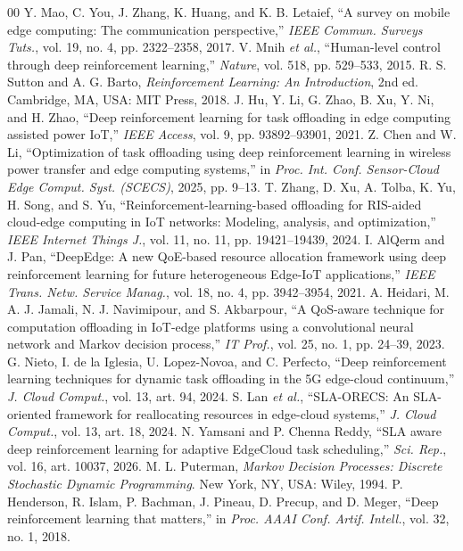 \documentclass[journal]{IEEEtran}
\begin{document}
\begin{thebibliography}{00}
 Y. Mao, C. You, J. Zhang, K. Huang, and K. B. Letaief, ``A survey on mobile edge computing: The communication perspective,'' \emph{IEEE Commun. Surveys Tuts.}, vol. 19, no. 4, pp. 2322--2358, 2017.
 V. Mnih \emph{et al.}, ``Human-level control through deep reinforcement learning,'' \emph{Nature}, vol. 518, pp. 529--533, 2015.
 R. S. Sutton and A. G. Barto, \emph{Reinforcement Learning: An Introduction}, 2nd ed. Cambridge, MA, USA: MIT Press, 2018.
 J. Hu, Y. Li, G. Zhao, B. Xu, Y. Ni, and H. Zhao, ``Deep reinforcement learning for task offloading in edge computing assisted power IoT,'' \emph{IEEE Access}, vol. 9, pp. 93892--93901, 2021.
 Z. Chen and W. Li, ``Optimization of task offloading using deep reinforcement learning in wireless power transfer and edge computing systems,'' in \emph{Proc. Int. Conf. Sensor-Cloud Edge Comput. Syst. (SCECS)}, 2025, pp. 9--13.
 T. Zhang, D. Xu, A. Tolba, K. Yu, H. Song, and S. Yu, ``Reinforcement-learning-based offloading for RIS-aided cloud-edge computing in IoT networks: Modeling, analysis, and optimization,'' \emph{IEEE Internet Things J.}, vol. 11, no. 11, pp. 19421--19439, 2024.
 I. AlQerm and J. Pan, ``DeepEdge: A new QoE-based resource allocation framework using deep reinforcement learning for future heterogeneous Edge-IoT applications,'' \emph{IEEE Trans. Netw. Service Manag.}, vol. 18, no. 4, pp. 3942--3954, 2021.
 A. Heidari, M. A. J. Jamali, N. J. Navimipour, and S. Akbarpour, ``A QoS-aware technique for computation offloading in IoT-edge platforms using a convolutional neural network and Markov decision process,'' \emph{IT Prof.}, vol. 25, no. 1, pp. 24--39, 2023.
 G. Nieto, I. de la Iglesia, U. Lopez-Novoa, and C. Perfecto, ``Deep reinforcement learning techniques for dynamic task offloading in the 5G edge-cloud continuum,'' \emph{J. Cloud Comput.}, vol. 13, art. 94, 2024.
 S. Lan \emph{et al.}, ``SLA-ORECS: An SLA-oriented framework for reallocating resources in edge-cloud systems,'' \emph{J. Cloud Comput.}, vol. 13, art. 18, 2024.
 N. Yamsani and P. Chenna Reddy, ``SLA aware deep reinforcement learning for adaptive EdgeCloud task scheduling,'' \emph{Sci. Rep.}, vol. 16, art. 10037, 2026.
 M. L. Puterman, \emph{Markov Decision Processes: Discrete Stochastic Dynamic Programming}. New York, NY, USA: Wiley, 1994.
 P. Henderson, R. Islam, P. Bachman, J. Pineau, D. Precup, and D. Meger, ``Deep reinforcement learning that matters,'' in \emph{Proc. AAAI Conf. Artif. Intell.}, vol. 32, no. 1, 2018.

\end{thebibliography}
\end{document}
